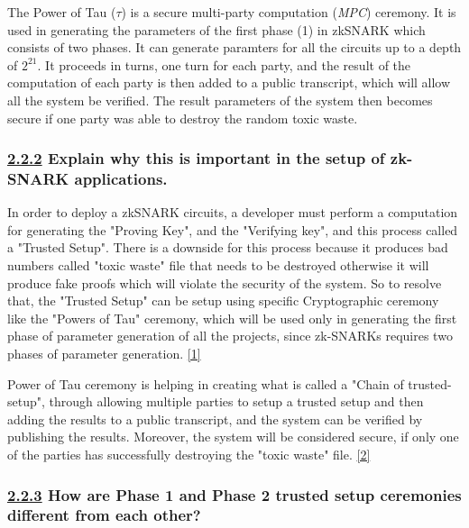 \documentclass[letterpaper, 10 pt, conference]{ieeeconf}  %
\begin{document}
The Power of Tau ($\tau$) is a secure multi-party computation (\textit{MPC}) ceremony. It is used in generating the parameters of the first phase (1) in zkSNARK which consists of two phases. It can generate paramters for all the circuits up to a depth of $2^{21}$. 
It proceeds in turns, one turn for each party, and the result of the computation of each party is then added to a public transcript, which will allow all the system be verified. The result parameters of the system then becomes secure if one party was able to destroy the random toxic waste. 

\subsubsection{\textbf{\underline{2.2.2} Explain why this is important in the setup of zk-SNARK applications.}}


In order to deploy a zkSNARK circuits, a developer must perform a computation for generating the "Proving Key", and the "Verifying key", and this process called a "Trusted Setup". There is a downside for this process because it produces bad numbers called "toxic waste" file that needs to be destroyed otherwise it will produce fake proofs which will violate the security of the system. So to resolve that, the "Trusted Setup" can be setup using specific Cryptographic ceremony like the "Powers of Tau" ceremony, which will be used only in generating the first phase of parameter generation of all the projects, since zk-SNARKs requires two phases of parameter generation. \href{https://medium.com/coinmonks/announcing-the-perpetual-powers-of-tau-ceremony-to-benefit-all-zk-snark-projects-c3da86af8377#:~:text=The%20Powers%20of%20Tau%20ceremony,protocol%20can%20be%20publicly%20verified.&text=Nevertheless%2C%20each%20ceremony%20takes%20time%20and%20is%20tedious%20to%20coordinate.}{[1]}

Power of Tau ceremony is helping in creating what is called a "Chain of trusted-setup", through allowing multiple parties to setup a trusted setup and then adding the results to a public transcript, and the system can be verified by publishing the results. Moreover, the system will be considered secure, if only one of the parties has successfully destroying the "toxic waste" file. \href{https://blog.hermez.io/hermez-zero-knowledge-proofs/}{[2]}


\subsubsection{\textbf{\underline{2.2.3} How are Phase 1 and Phase 2 trusted setup ceremonies different from each other?}}
\end{document}
